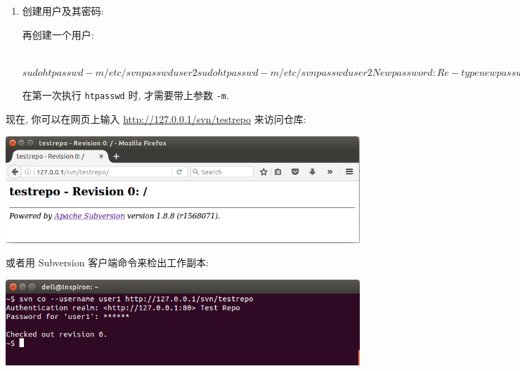 \documentclass[nofonts, oneside]{ctexbook}
\begin{document}
\begin{enumerate}
  \item 创建用户及其密码:
    再创建一个用户:
\begin{svnshell}
~$ sudo htpasswd -m /etc/svnpasswd user2
sudo htpasswd -m /etc/svnpasswd user2
New password: 
Re-type new password: 
Adding password for user user2
svn$ 

\end{svnshell}
    在第一次执行 \texttt{htpasswd} 时, 才需要带上参数 \texttt{-m}.
\end{enumerate}

现在, 你可以在网页上输入 \url{http://127.0.0.1/svn/testrepo} 来访问仓库:
\begin{center}
    \includegraphics[scale=0.55]{./images/webtestrepo.png}
\end{center}
或者用 Subversion 客户端命令来检出工作副本:
\begin{center}
    \includegraphics[scale=0.6]{./images/terminalrepo.png}
\end{center}

\backmatter
{}

\printindex
\end{document}

